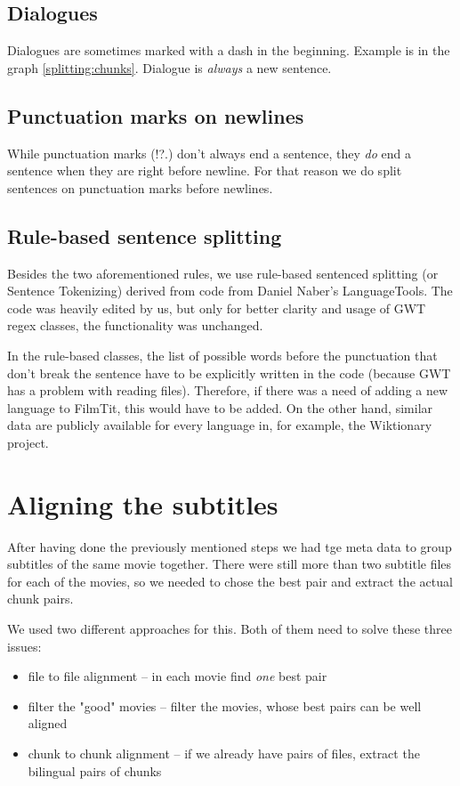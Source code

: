\subsection*{Dialogues}
Dialogues are sometimes marked with a dash in the beginning. Example is in the graph \ref{splitting:chunks}. Dialogue is \emph{always} a new sentence.

\subsection*{Punctuation marks on newlines}
While punctuation marks (!?.) don't always end a sentence, they \emph{do} end a sentence when they are right before newline. For that reason we do split sentences on punctuation marks before newlines.

\subsection*{Rule-based sentence splitting}
Besides the two aforementioned rules, we use rule-based sentenced splitting (or Sentence Tokenizing) derived from code from Daniel Naber's LanguageTools. The code was heavily edited by us, but only for better clarity and usage of GWT regex classes, the functionality was unchanged.

In the rule-based classes, the list of possible words before the punctuation that don't break the sentence have to be explicitly written in the code (because GWT has a problem with reading files). Therefore, if there was a need of adding a new language to FilmTit, this would have to be added. On the other hand, similar data are publicly available for every language in, for example, the Wiktionary project.

\section{Aligning the subtitles}
\label{sec:aligning_subtitles}

After having done the previously mentioned steps we had tge meta data to group subtitles of the same movie together. There were still more than two subtitle files for each of the movies, so we needed to chose the best pair and extract the actual chunk pairs.

We used two different approaches for this. Both of them need to solve these three issues:
\begin{itemize}
    \item file to file alignment -- in each movie find \emph{one} best pair
    \item filter the "good" movies -- filter the movies, whose best pairs can be well aligned
    \item chunk to chunk alignment -- if we already have pairs of files, extract the bilingual pairs of chunks 
\end{itemize}


